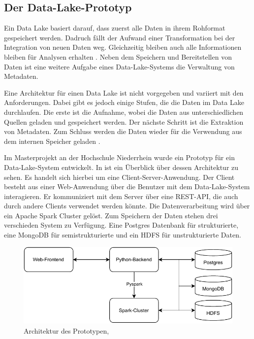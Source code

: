 \subsection{Der Data-Lake-Prototyp}
Ein Data Lake basiert darauf, dass zuerst alle Daten in ihrem Rohformat gespeichert werden.
Dadruch fällt der Aufwand einer Transformation bei der Integration von neuen Daten weg.
Gleichzeitig bleiben auch alle Informationen bleiben für Analysen erhalten \parencite{datalake_03}.
Neben dem Speichern und Bereitstellen von Daten ist eine weitere Aufgabe eines Data-Lake-Systems die Verwaltung von Metadaten.

Eine Architektur für einen Data Lake ist nicht vorgegeben und variiert mit den Anforderungen.
Dabei gibt es jedoch einige Stufen, die die Daten im Data Lake durchlaufen.
Die erste ist die Aufnahme, wobei die Daten aus unterschiedlichen Quellen geladen und gespeichert werden.
Der nächste Schritt ist die Extraktion von Metadaten.
Zum Schluss werden die Daten wieder für die Verwendung aus dem internen Speicher geladen \parencite{datalake_01}.

Im Masterprojekt  \parencite{prototyp} an der Hochschule Niederrhein wurde ein Prototyp für ein Data-Lake-System entwickelt.
In  ist ein Überblick über dessen Architektur zu sehen.
Es handelt sich hierbei um eine Client-Server-Anwendung.
Der Client besteht aus einer Web-Anwendung über die Benutzer mit dem Data-Lake-System interagieren.
Er kommuniziert mit dem Server über eine REST-API, die auch durch andere Clients verwendet werden könnte.
Die Datenverarbeitung wird über ein Apache Spark Cluster gelöst.
Zum Speichern der Daten stehen drei verschieden System zu Verfügung.
Eine Postgres Datenbank für strukturierte, eine MongoDB für semistrukturierte und ein HDFS für unstrukturierte Daten.

\begin{figure}
    \centering
    \includegraphics{Grafiken/Prototyp-Architektur.pdf}
    \caption{Architektur des Prototypen, }
    \label{fig:prototyp-architektur}
\end{figure}

